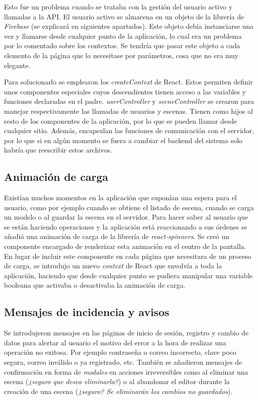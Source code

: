 Esto fue un problema cuando se trataba con la gestión del usuario activo y llamadas a la API. El usuario activo se almacena en un objeto de la librería de \textit{Firebase} (se explicará en siguientes apartados). Este objeto debía instanciarse una vez y llamarse desde cualquier punto de la aplicación, lo cual era un problema por lo comentado sobre los contextos. Se tendría que pasar este objeto a cada elemento de la página que lo necesitase por parámetros, cosa que no era muy elegante.

Para solucionarlo se emplearon los \textit{createContext} de React. Estos permiten definir unos componentes especiales cuyos descendientes tienen acceso a las variables y funciones declaradas en el padre. \textit{userController} y \textit{sceneController} se crearon para manejar respectivamente las llamadas de usuarios y escenas. Tienen como hijos al resto de los componentes de la aplicación, por lo que se pueden llamar desde cualquier sitio. Además, encapsulan las funciones de comunicación con el servidor, por lo que si en algún momento se fuera a cambiar el backend del sistema solo habría que reescribir estos archivos.

\subsection{Animación de carga}

Existían muchos momentos en la aplicación que suponían una espera para el usuario, como por ejemplo cuando se obtiene el listado de escena, cuando se carga un modelo o al guardar la escena en el servidor. Para hacer saber al usuario que se están haciendo operaciones y la aplicación está reaccionando a sus órdenes se añadió una animación de carga de la librería de \textit{react-spinners}\cite{reactspinners}. Se creó un componente encargado de renderizar esta animación en el centro de la pantalla. En lugar de incluir este componente en cada página que necesitara de un proceso de carga, se introdujo un nuevo \textit{context} de React que envolvía a toda la aplicación, haciendo que desde cualquier punto se pudiera manipular una variable booleana que activaba o desactivaba la animación de carga.

\subsection{Mensajes de incidencia y avisos}

Se introdujeron mensajes en las páginas de inicio de sesión, registro y cambio de datos para alertar al usuario el motivo del error a la hora de realizar una operación no exitosa. Por ejemplo contraseña o correo incorrecto, clave poco segura, correo inválido o ya registrado, etc. También se añadieron mensajes de confirmación en forma de \textit{modales} en acciones irreversibles como al eliminar una escena (\textit{¿seguro que desea eliminarla?}) o al abandonar el editor durante la creación de una escena (\textit{¿seguro? Se eliminarán los cambios no guardados}).

